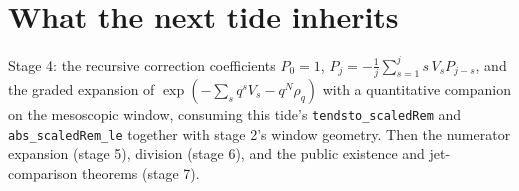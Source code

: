 \documentclass[11pt]{article}
\newcommand{\code}[1]{\texttt{#1}}
\begin{document}
\section{What the next tide inherits}

Stage 4: the recursive correction coefficients
$P_0 = 1$, $P_j = -\tfrac1j \sum_{s=1}^{j} s\,V_s P_{j-s}$, and the
graded expansion of $\exp(-\sum_s q^s V_s - q^N \rho_q)$ with a
quantitative companion on the mesoscopic window, consuming this
tide's \code{tendsto\_scaledRem} and \code{abs\_scaledRem\_le}
together with stage 2's window geometry. Then the numerator
expansion (stage 5), division (stage 6), and the public existence
and jet-comparison theorems (stage 7).
\end{document}
